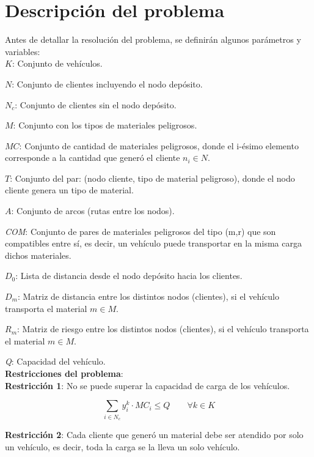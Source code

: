 \documentclass[conference]{IEEEtran}
\begin{document}
\section{Descripci\'on del problema}

Antes de detallar la resoluci\'on del problema, se definir\'an algunos par\'ametros y variables:
\\

\textit{$K$}: Conjunto de veh\'iculos.

\textit{$N$}: Conjunto de clientes incluyendo el nodo dep\'osito.

\textit{$N_c$}: Conjunto de clientes sin el nodo dep\'osito.

\textit{$M$}: Conjunto con los tipos de materiales peligrosos.

\textit{$MC$}: Conjunto de cantidad de materiales peligrosos, donde el i-\'esimo elemento corresponde a la cantidad que gener\'o el cliente $n_i \in N$.

\textit{$T$}: Conjunto del par: (nodo cliente, tipo de material peligroso), donde el nodo cliente genera un tipo de material.

\textit{$A$}: Conjunto de arcos (rutas entre los nodos).

\textit{COM}: Conjunto de pares de materiales peligrosos del tipo (m,r) que son compatibles entre s\'i, es decir, un veh\'iculo puede transportar en la misma carga dichos materiales.

\textit{$D_0$}: Lista de distancia desde el nodo dep\'osito hacia los clientes.

\textit{$D_m$}: Matriz de distancia entre los distintos nodos (clientes), si el veh\'iculo transporta el material $m \in M$.

\textit{$R_m$}: Matriz de riesgo entre los distintos nodos (clientes), si el veh\'iculo transporta el material $m \in M$.

\textit{Q}: Capacidad del veh\'iculo.
\\

\textbf{Restricciones del problema}:
\\

\textbf{Restricci\'on 1}: No se puede superar la capacidad de carga de los veh\'iculos.

    \begin{equation}
           \sum_{i \in N_c}  y^{k}_{i} \cdot MC_i \leq Q \qquad \forall \textit{k} \in \textit{K}
    \end{equation}

\textbf{Restricci\'on 2}: Cada cliente que gener\'o un material debe ser atendido por solo un veh\'iculo, es decir, toda la carga se la lleva un solo veh\'iculo.
\end{document}
